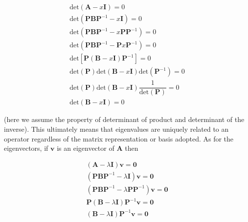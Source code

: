 \begin{gather}
	\text{det}\left(\mathbf{A} - x\mathbf{I}\right) = 0\nonumber \\[5mm]
	\text{det}\left(\mathbf{PBP}^{-1} - x\mathbf{I}\right) = 0\nonumber \\[5mm]
	\text{det}\left(\mathbf{PBP}^{-1} - x\mathbf{PP}^{-1}\right) = 0\nonumber \\[5mm]
	\text{det}\left(\mathbf{PBP}^{-1} - \mathbf{P}x\mathbf{P}^{-1}\right) = 0\nonumber \\[5mm]
	\text{det}\left[\mathbf{P}\left(\mathbf{B} - x\mathbf{I}\right)\mathbf{P}^{-1}\right] = 0\nonumber \\[5mm]
	\text{det}\left(\mathbf{P}\right)\text{det}\left(\mathbf{B} - x\mathbf{I}\right) \text{det}\left(\mathbf{P}^{-1}\right)  = 0\nonumber \\[5mm]
	\text{det}\left(\mathbf{P}\right)\text{det}\left(\mathbf{B} - x\mathbf{I}\right) \dfrac{1}{\text{det}\left(\mathbf{P}\right)}  = 0\nonumber \\[5mm]
	\text{det}\left(\mathbf{B} - x\mathbf{I}\right) = 0
\end{gather}

	\noindent (here we assume the property of determinant of product and determinant of the inverse). This ultimately means that eigenvalues are uniquely related to an operator regardless of the matrix representation or basis adopted. As for the eigenvectors, if $\mathbf{v}$ is an eigenvector of $\mathbf{A}$ then

\begin{gather}
	\left(\mathbf{A} - \lambda\mathbf{I}\right)\mathbf{v} = \mathbf{0} \nonumber\\[5mm]
	\left(\mathbf{PBP}^{-1} - \lambda\mathbf{I}\right)\mathbf{v} = \mathbf{0} \nonumber\\[5mm]
	\left(\mathbf{PBP}^{-1} - \lambda\mathbf{PP}^{-1}\right)\mathbf{v} = \mathbf{0} \nonumber\\[5mm]
	\mathbf{P}\left(\mathbf{B} - \lambda \mathbf{I}\right)\mathbf{P}^{-1}\mathbf{v} = \mathbf{0} \nonumber\\[5mm]
	\left(\mathbf{B} - \lambda \mathbf{I}\right)\mathbf{P}^{-1}\mathbf{v} = \mathbf{0}
\end{gather}

